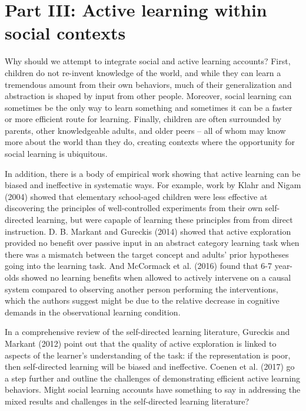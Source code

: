 \documentclass[english,man]{apa6}
\newcounter{author}
\theoremstyle{definition}
\theoremstyle{definition}
\theoremstyle{definition}
\theoremstyle{remark}
\begin{document}
\section{Part III: Active learning within social
contexts}\label{part-iii-active-learning-within-social-contexts}

Why should we attempt to integrate social and active learning accounts?
First, children do not re-invent knowledge of the world, and while they
can learn a tremendous amount from their own behaviors, much of their
generalization and abstraction is shaped by input from other people.
Moreover, social learning can sometimes be the only way to learn
something and sometimes it can be a faster or more efficient route for
learning. Finally, children are often surrounded by parents, other
knowledgeable adults, and older peers -- all of whom may know more about
the world than they do, creating contexts where the opportunity for
social learning is ubiquitous.

In addition, there is a body of empirical work showing that active
learning can be biased and ineffective in systematic ways. For example,
work by Klahr and Nigam (2004) showed that elementary school-aged
children were less effective at discovering the principles of
well-controlled experiments from their own self-directed learning, but
were capaple of learning these principles from from direct instruction.
D. B. Markant and Gureckis (2014) showed that active exploration
provided no benefit over passive input in an abstract category learning
task when there was a mismatch between the target concept and adults'
prior hypotheses going into the learning task. And McCormack et al.
(2016) found that 6-7 year-olds showed no learning benefits when allowed
to actively intervene on a causal system compared to observing another
person performing the interventions, which the authors suggest might be
due to the relative decrease in cognitive demands in the observational
learning condition.

In a comprehensive review of the self-directed learning literature,
Gureckis and Markant (2012) point out that the quality of active
exploration is linked to aspects of the learner's understanding of the
task: if the representation is poor, then self-directed learning will be
biased and ineffective. Coenen et al. (2017) go a step further and
outline the challenges of demonstrating efficient active learning
behaviors. Might social learning accounts have something to say in
addressing the mixed results and challenges in the self-directed
learning literature?
\end{document}

